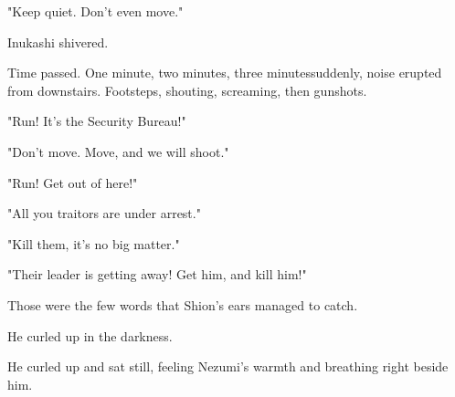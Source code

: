 "Keep quiet. Don't even move."

Inukashi shivered.

Time passed. One minute, two minutes, three minutes\el suddenly, noise
erupted from downstairs. Footsteps, shouting, screaming, then gunshots.

"Run! It's the Security Bureau!"

"Don't move. Move, and we will shoot."

"Run! Get out of here!"

"All you traitors are under arrest."

"Kill them, it's no big matter."

"Their leader is getting away! Get him, and kill him!"

Those were the few words that Shion's ears managed to catch.

He curled up in the darkness.

He curled up and sat still, feeling Nezumi's warmth and breathing right
beside him.